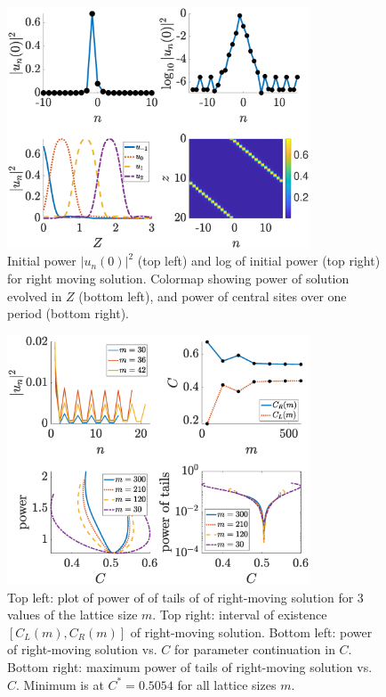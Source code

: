\documentclass[reprint, amsmath,amssymb,aps,pre]{revtex4-2}
\begin{document}
\begin{figure}
    \centering
    \includegraphics[width=9cm]{rightsol.eps}
    \caption{Initial power $|u_n(0)|^2$ (top left) and log of initial power (top right) for right moving solution. Colormap showing power of solution evolved in $Z$ (bottom left), and power of central sites over one period (bottom right).}
    \label{fig:rightsol}
\end{figure}

\begin{figure}
    \centering
    \includegraphics[width=9cm]{rightdiag.eps}
    \caption{Top left: plot of power of of tails of of right-moving solution for 3 values of the lattice size $m$. Top right: interval of existence $[C_L(m),C_R(m)]$ of right-moving solution. Bottom left: power of right-moving solution vs. $C$ for parameter continuation in $C$. Bottom right: maximum power of tails of right-moving solution vs. $C$. Minimum is at $C^* = 0.5054$ for all lattice sizes $m$.}
    \label{fig:rightdiag}
\end{figure}
\end{document}
